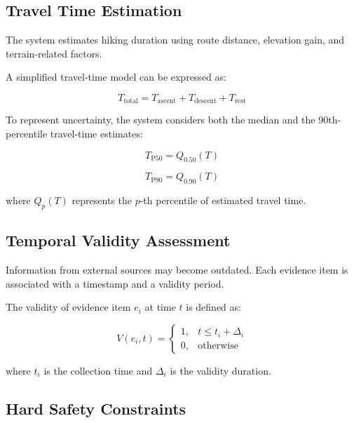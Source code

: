 \documentclass[conference]{IEEEtran}
\begin{document}
\subsection{Travel Time Estimation}

The system estimates hiking duration using route distance,
elevation gain, and terrain-related factors.

A simplified travel-time model can be expressed as:

\begin{equation}
T_{\mathrm{total}} =
T_{\mathrm{ascent}} +
T_{\mathrm{descent}} +
T_{\mathrm{rest}}
\label{eq:travel}
\end{equation}

To represent uncertainty, the system considers both the median
and the 90th-percentile travel-time estimates:

\begin{equation}
T_{\mathrm{P50}} = Q_{0.50}(T)
\end{equation}

\begin{equation}
T_{\mathrm{P90}} = Q_{0.90}(T)
\end{equation}

where $Q_p(T)$ represents the $p$-th percentile of estimated
travel time.

\subsection{Temporal Validity Assessment}

Information from external sources may become outdated.
Each evidence item is associated with a timestamp and a validity
period.

The validity of evidence item $e_i$ at time $t$ is defined as:

\begin{equation}
V(e_i,t) =
\begin{cases}
1, & t \leq t_i + \Delta_i \\
0, & \text{otherwise}
\end{cases}
\label{eq:validity}
\end{equation}

where $t_i$ is the collection time and $\Delta_i$ is the
validity duration.

\subsection{Hard Safety Constraints}
\end{document}
